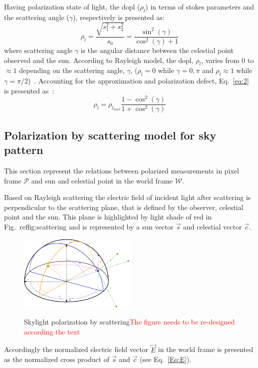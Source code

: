 Having polarization state of light, the \gls{dopl} ($\rho_{l}$) in terms of stokes
parameters and the scattering angle ($\gamma$), respectively is presented as:
\begin{equation}
  \label{eq:2}
  \rho_{l} = \frac{\sqrt{s_{1}^{2}+s_{2}^{2}}}{s_0} =
  \frac{\sin^{2}(\gamma)}{\cos^{
      2}(\gamma)+1}
\end{equation}
\noindent where scattering angle $\gamma$ is the angular distance between the
celestial point observed and the sun.
According to Rayleigh model, the \gls{dopl}, $\rho_{l}$, varies
from 0 to $\approx 1$ depending on the scattering angle, $\gamma$, ($\rho_{l} =
0$ while $\gamma = 0, \pi$ and $\rho_{l} \approx 1$ while $\gamma =
\pi/2$)~\cite{smith2007polarization, miyazaki09sunlightpolarization}.
Accounting for the approximation and polarization defect, Eq.~\ref{eq:2}
is presented as~\cite{pomozi2001clearsky}:
\begin{equation}
  \label{eq:3}
  \rho_{l} = \rho_{l_{max}}\frac{1 - \cos^{2}(\gamma)}{1 + \cos^{
      2}(\gamma)}
\end{equation}


\subsection{Polarization by scattering model for sky pattern}
\label{subsec:pscattering}
This section represent the relations between polarized measurements in pixel
frame $\mathcal{P}$ and sun and celestial point in the world frame
$\mathcal{W}$.

Based on Rayleigh scattering the electric field of incident light after
scattering is perpendicular to the scattering plane, that is defined by the
observer, celestial point and the sun.
This plane is highlighted by light shade of red in Fig.~ref{fig:scattering} and
is represented by a sun vector $\vec{s}$ and celestial vector $\vec{c}$.

\begin{figure}
  \centering
  \includegraphics[width=0.5\textwidth]{./content/intro/figures/polasky4-crop.pdf}
  \label{fig:scattering}
  \caption{Skylight polarization by scattering\textcolor{red}{The figure needs
      to be re-designed according the text}}
\end{figure}
Accordingly the normalized electric field vector $\vec{E}$ in the world frame
is presented as the normalized cross product of $\vec{s}$ and
$\vec{c}$ (see Eq.~\ref{Eq:E}).

